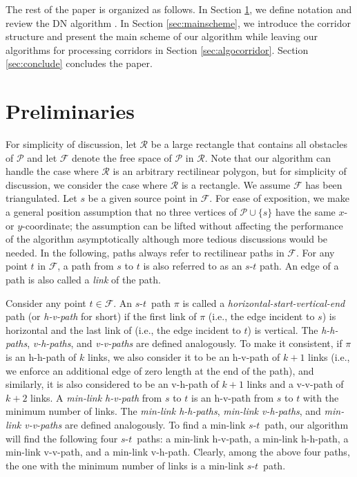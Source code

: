 \documentclass[english,runningheads,11pt]{llncs-revised}
\def\calP{\mathcal{P}}
\def\calR{\mathcal{R}}
\def\calF{\mathcal{F}}
\def\st{$s$-$t$}
\begin{document}
The rest of the paper is organized as follows.
In Section \ref{sec:pre}, we define notation and
review the DN algorithm \cite{ref:DasGe91}.
In Section \ref{sec:mainscheme}, we introduce the corridor structure
and present the main scheme of our algorithm while leaving our
algorithms for processing corridors in Section \ref{sec:algocorridor}.
Section \ref{sec:conclude} concludes the paper.

\section{Preliminaries}
\label{sec:pre}

For simplicity of discussion,
let $\calR$ be a large rectangle that contains all obstacles of
$\calP$ and let $\calF$ denote the free space of $\calP$ in $\calR$. Note that our algorithm can handle the case where $\calR$ is an arbitrary rectilinear polygon, but for simplicity of discussion, we consider the case where $\calR$ is a rectangle.
We assume $\calF$ has been triangulated. Let $s$ be a given source
point in $\calF$.  For ease of exposition, we make a general position
assumption that no three vertices of $\calP\cup\{s\}$ have
the same $x$- or $y$-coordinate; the assumption can be lifted without
affecting the performance of the algorithm asymptotically although
more tedious discussions would be needed.
In the following, paths always refer to
rectilinear paths in $\calF$. For any point $t$ in
$\calF$, a path from $s$ to $t$ is also referred to as an $s$-$t$
path. An edge of a path is also called a {\em link} of the path.

Consider any point $t\in \calF$.
An \st\ path $\pi$ is called a {\em horizontal-start-vertical-end}
path (or {\em h-v-path} for short)
if the first link of $\pi$ (i.e., the edge incident to $s$) is
horizontal and the last link of  (i.e., the edge incident to $t$) is
vertical. The {\em h-h-paths}, {\em v-h-paths}, and {\em v-v-paths} are
defined analogously.
To make it consistent, if $\pi$ is an h-h-path of $k$ links,
we also consider it to be an h-v-path of $k+1$ links (i.e., we
enforce an additional edge of zero length at the end of the path), and
similarly, it is also considered to be an v-h-path of $k+1$ links and
a v-v-path of $k+2$ links. A {\em min-link h-v-path} from $s$ to $t$ is an h-v-path from $s$ to $t$ with
the minimum number of links. The {\em min-link h-h-paths}, {\em min-link v-h-paths}, and {\em min-link v-v-paths} are
defined analogously.
To find a min-link \st\ path, our algorithm will
find the following four \st\ paths: a min-link h-v-path,   a min-link
h-h-path,  a min-link v-v-path, and a min-link v-h-path. Clearly,
among the above four paths, the one with the minimum number of links
is a min-link \st\ path.
\end{document}
